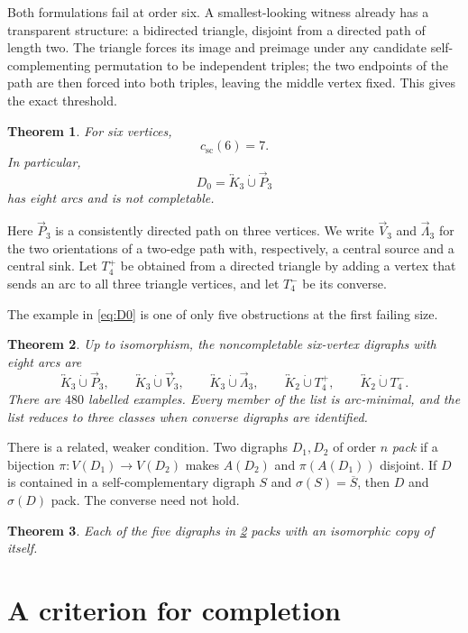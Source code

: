 \documentclass[11pt,reqno]{amsart}
\newtheorem{theorem}{Theorem}[section]
\theoremstyle{definition}
\newcommand{\cthreshold}{c_{\mathrm{sc}}}
\newcommand{\bK}[1]{\overleftrightarrow{K}_{#1}}
\newcommand{\dP}{\overrightarrow{P}_{3}}
\newcommand{\dV}{\overrightarrow{V}_{3}}
\newcommand{\dL}{\overrightarrow{\Lambda}_{3}}
\newcommand{\dunion}{\mathbin{\dot\cup}}
\begin{document}
Both formulations fail at order six. A smallest-looking witness already has a transparent structure: a bidirected triangle, disjoint from a directed path of length two. The triangle forces its image and preimage under any candidate self-complementing permutation to be independent triples; the two endpoints of the path are then forced into both triples, leaving the middle vertex fixed. This gives the exact threshold.

\begin{theorem}\label{thm:main-threshold}
For six vertices,
\[
\cthreshold(6)=7.
\]
In particular,
\begin{equation}\label{eq:D0}
D_0=\bK{3}\dunion\dP
\end{equation}
has eight arcs and is not completable.
\end{theorem}

Here \(\dP\) is a consistently directed path on three vertices. We write \(\dV\) and \(\dL\) for the two orientations of a two-edge path with, respectively, a central source and a central sink. Let \(T_4^+\) be obtained from a directed triangle by adding a vertex that sends an arc to all three triangle vertices, and let \(T_4^-\) be its converse.

The example in \eqref{eq:D0} is one of only five obstructions at the first failing size.

\begin{theorem}\label{thm:main-classification}
Up to isomorphism, the noncompletable six-vertex digraphs with eight arcs are
\[
\bK{3}\dunion\dP,
\qquad
\bK{3}\dunion\dV,
\qquad
\bK{3}\dunion\dL,
\qquad
\bK{2}\dunion T_4^+,
\qquad
\bK{2}\dunion T_4^-.
\]
There are \(480\) labelled examples. Every member of the list is arc-minimal, and the list reduces to three classes when converse digraphs are identified.
\end{theorem}

There is a related, weaker condition. Two digraphs \(D_1,D_2\) of order \(n\) \emph{pack} if a bijection \(\pi:V(D_1)\to V(D_2)\) makes \(A(D_2)\) and \(\pi(A(D_1))\) disjoint. If \(D\) is contained in a self-complementary digraph \(S\) and \(\sigma(S)=\overline S\), then \(D\) and \(\sigma(D)\) pack. The converse need not hold.

\begin{theorem}\label{thm:main-packing}
Each of the five digraphs in \cref{thm:main-classification} packs with an isomorphic copy of itself.
\end{theorem}

\section{A criterion for completion}\label{sec:criterion}
\end{document}
